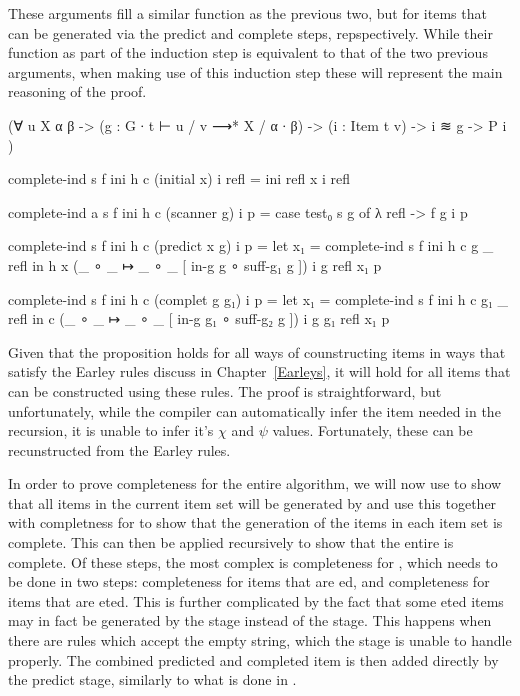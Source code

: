 		These arguments fill a similar function as the previous two, but for
		items that can be generated via the predict and complete steps,
		repspectively. While their function as part of the induction step is
		equivalent to that of the two previous arguments, when making use of
		this induction step these will represent the main reasoning of the
		proof.

		\begin{code}
			  (∀ {u X α β} ->
			    (g : G ∙ t ⊢ u / v ⟶* X / α ∙ β) ->
			    (i : Item t v) ->
			    i ≋ g ->
			    P i
			  )

			complete-ind s f ini h c (initial x) i refl =
			  ini refl x i refl

			complete-ind {a} s f ini h c (scanner g) i p =
			  case test₀ s g of λ {refl -> f g i p}

			complete-ind s f ini h c (predict x g) i p =
			  let x₁ = complete-ind s f ini h c g _ refl in
			  h x (_ ∘ _ ↦ _ ∘ _ [ in-g g ∘ suff-g₁ g ]) i g refl x₁ p

			complete-ind s f ini h c (complet g g₁) i p =
			  let x₁ = complete-ind s f ini h c g₁ _ refl in
			  c (_ ∘ _ ↦ _ ∘ _ [ in-g g₁ ∘ suff-g₂ g ]) i g g₁ refl x₁ p
		\end{code}

		Given that the proposition holds for all ways of counstructing items in
		ways that satisfy the Earley rules discuss in Chapter~\ref{Earleys}, it
		will hold for all items that can be constructed using these rules. The
		proof is straightforward, but unfortunately, while the compiler can
		automatically infer the item needed in the recursion, it is unable to
		infer it's $\chi$ and $\psi$ values. Fortunately, these can be
		recunstructed from the Earley rules.

		In order to prove completeness for the entire algorithm, we will now
		use  to show that all items in the current item
		set will be generated by  and use this together with
		completness for  to show that the generation of the items
		in each item set is complete. This can then be applied recursively to
		show that the entire  is complete. Of these steps, the
		most complex is completeness for , which needs to be
		done in two steps: completeness for items that are ed,
		and completeness for items that are eted. This is further
		complicated by the fact that some eted items may in fact
		be generated by the  stage instead of the
		 stage. This happens when there are rules which accept
		the empty string, which the  stage is unable to handle
		properly. The combined predicted and completed item is then added
		directly by the predict stage, similarly to what is done in
		\cite{aycock02}.

